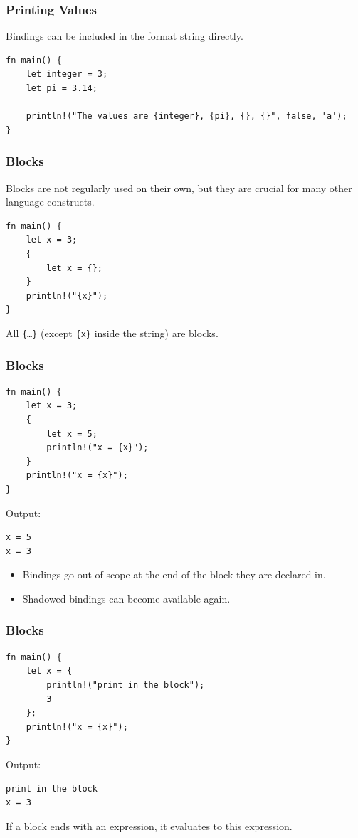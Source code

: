\documentclass[aspectratio=169]{beamer}
\begin{document}
\begin{frame}[fragile]
    \frametitle{Printing Values}
    Bindings can be included in the format string directly.
    \begin{verbatim}
fn main() {
    let integer = 3;
    let pi = 3.14;

    println!("The values are {integer}, {pi}, {}, {}", false, 'a');
}
    \end{verbatim}
\end{frame}

\begin{frame}[fragile]
    \frametitle{Blocks}
    Blocks are not regularly used on their own, but they are crucial for many other language constructs.

    \pause
    \begin{verbatim}
fn main() {
    let x = 3;
    {
        let x = {};
    }
    println!("{x}");
}
    \end{verbatim}
    All \texttt{\{\ldots\}} (except \texttt{\{x\}} inside the string) are blocks.
\end{frame}

\begin{frame}[fragile]
    \frametitle{Blocks}
    \begin{verbatim}
fn main() {
    let x = 3;
    {
        let x = 5;
        println!("x = {x}");
    }
    println!("x = {x}");
}
    \end{verbatim}
    \pause
    Output:
    \begin{verbatim}
x = 5
x = 3
    \end{verbatim}
    \pause
    \begin{itemize}
        \item Bindings go out of scope at the end of the block they are declared in.
        \item Shadowed bindings can become available again.
    \end{itemize}
\end{frame}

\begin{frame}[fragile]
    \frametitle{Blocks}
    \begin{verbatim}
fn main() {
    let x = {
        println!("print in the block");
        3
    };
    println!("x = {x}");
}
    \end{verbatim}
    \pause
    Output:
    \begin{verbatim}
print in the block
x = 3
    \end{verbatim}
    \pause
    If a block ends with an expression, it evaluates to this expression.
\end{frame}
\end{document}
